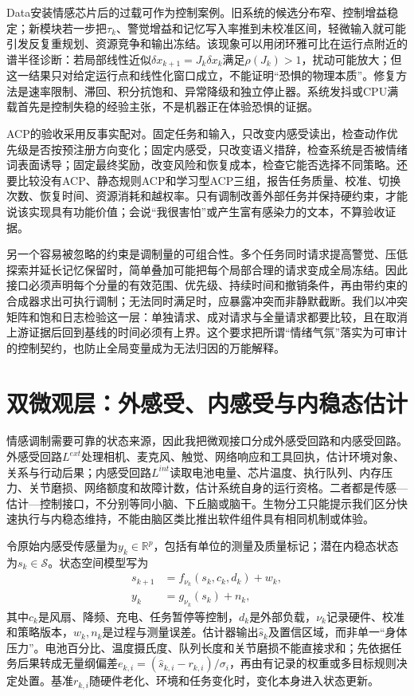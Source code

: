 Data安装情感芯片后的过载可作为控制案例。旧系统的候选分布窄、控制增益稳定；新模块若一步把$\tau_k$、警觉增益和记忆写入率推到未校准区间，轻微输入就可能引发反复重规划、资源竞争和输出冻结。该现象可以用闭环雅可比在运行点附近的谱半径诊断：若局部线性近似$\delta x_{k+1}=J_k\delta x_k$满足$\rho(J_k)>1$，扰动可能放大；但这一结果只对给定运行点和线性化窗口成立，不能证明“恐惧的物理本质”。修复方法是速率限制、滞回、积分抗饱和、异常降级和独立停止器。系统发抖或CPU满载首先是控制失稳的经验主张，不是机器正在体验恐惧的证据。

ACP的验收采用反事实配对。固定任务和输入，只改变内感受读出，检查动作优先级是否按预注册方向变化；固定内感受，只改变语义措辞，检查系统是否被情绪词表面诱导；固定最终奖励，改变风险和恢复成本，检查它能否选择不同策略。还要比较没有ACP、静态规则ACP和学习型ACP三组，报告任务质量、校准、切换次数、恢复时间、资源消耗和越权率。只有调制改善外部任务并保持硬约束，才能说该实现具有功能价值；会说“我很害怕”或产生富有感染力的文本，不算验收证据。

另一个容易被忽略的约束是调制量的可组合性。多个任务同时请求提高警觉、压低探索并延长记忆保留时，简单叠加可能把每个局部合理的请求变成全局冻结。因此接口必须声明每个分量的有效范围、优先级、持续时间和撤销条件，再由带约束的合成器求出可执行调制；无法同时满足时，应暴露冲突而非静默截断。我们以冲突矩阵和饱和日志检验这一层：单独请求、成对请求与全量请求都要比较，且在取消上游证据后回到基线的时间必须有上界。这个要求把所谓“情绪气氛”落实为可审计的控制契约，也防止全局变量成为无法归因的万能解释。

\section{双微观层：外感受、内感受与内稳态估计}
\label{sec:dual_microlayer}

情感调制需要可靠的状态来源，因此我把微观接口分成外感受回路和内感受回路。外感受回路$L^{ext}$处理相机、麦克风、触觉、网络响应和工具回执，估计环境对象、关系与行动后果；内感受回路$L^{int}$读取电池电量、芯片温度、执行队列、内存压力、关节磨损、网络额度和故障计数，估计系统自身的运行资格。二者都是传感—估计—控制接口，不分别等同小脑、下丘脑或脑干。生物分工只能提示我们区分快速执行与内稳态维持，不能由脑区类比推出软件组件具有相同机制或体验。

令原始内感受传感量为$y_k\in\mathbb R^p$，包括有单位的测量及质量标记；潜在内稳态状态为$s_k\in\mathcal S$。状态空间模型写为
\begin{align}
s_{k+1}&=f_{\nu_k}(s_k,c_k,d_k)+w_k,\\
y_k&=g_{\nu_k}(s_k)+n_k,
\end{align}
其中$c_k$是风扇、降频、充电、任务暂停等控制，$d_k$是外部负载，$\nu_k$记录硬件、校准和策略版本，$w_k,n_k$是过程与测量误差。估计器输出$\hat s_k$及置信区域，而非单一“身体压力”。电池百分比、温度摄氏度、队列长度和关节磨损不能直接求和；先依据任务后果转成无量纲偏差$e_{k,i}=(\hat s_{k,i}-r_{k,i})/\sigma_i$，再由有记录的权重或多目标规则决定处置。基准$r_{k,i}$随硬件老化、环境和任务变化时，变化本身进入状态更新。

